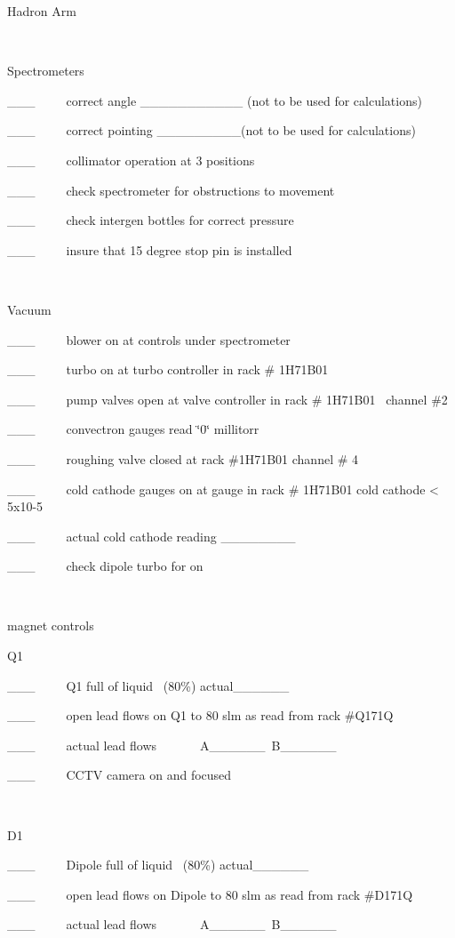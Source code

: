 Hadron Arm

~

Spectrometers

\_\_\_~~~~~correct angle \_\_\_\_\_\_\_\_\_\_\_ (not to be used for calculations)

\_\_\_~~~~~correct pointing \_\_\_\_\_\_\_\_\_(not to be used for calculations)

\_\_\_~~~~~collimator operation at 3 positions

\_\_\_~~~~~check spectrometer for obstructions to movement

\_\_\_~~~~~check intergen bottles for correct pressure

\_\_\_~~~~~insure that 15 degree stop pin is installed

~

Vacuum 

\_\_\_~~~~~blower on at controls under spectrometer

\_\_\_~~~~~turbo on at turbo controller in rack \# 1H71B01

\_\_\_~~~~~pump valves open at valve controller in rack \# 1H71B01~ channel
\#2 

\_\_\_~~~~~convectron gauges read \char`\"{}0\char`\"{} millitorr 

\_\_\_~~~~~roughing valve closed at rack \#1H71B01 channel \# 4 

\_\_\_~~~~~cold cathode gauges on at gauge in rack \# 1H71B01 cold cathode < 5x10-5

\_\_\_~~~~~actual cold cathode reading \_\_\_\_\_\_\_\_

\_\_\_~~~~~check dipole turbo for on

~

magnet controls

Q1

\_\_\_~~~~~Q1 full of liquid~ (80\%) actual\_\_\_\_\_\_

\_\_\_~~~~~open lead flows on Q1 to 80 slm as read from rack \#Q171Q

\_\_\_~~~~~actual lead flows~~~~~~~A\_\_\_\_\_\_~B\_\_\_\_\_\_

\_\_\_~~~~~CCTV camera on and focused

~

D1

\_\_\_~~~~~Dipole full of liquid~ (80\%) actual\_\_\_\_\_\_

\_\_\_~~~~~open lead flows on Dipole to 80 slm as read from rack \#D171Q

\_\_\_~~~~~actual lead flows~~~~~~~A\_\_\_\_\_\_~B\_\_\_\_\_\_

